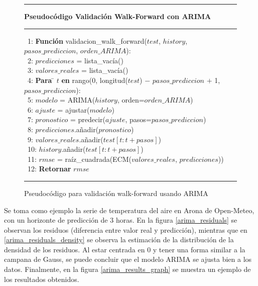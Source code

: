 \begin{figure}[H]
{\small
\hrule
{\bf\small Pseudocódigo Validación Walk-Forward con ARIMA}
\hrule
\begin{center}
\begin{tabbing}
\ 1: {\bf Fun}\={\bf ción} validacion\_walk\_forward($test$, $history$, $pasos\_prediccion$, $orden\_ARIMA$): \\
\ 2: \> $predicciones$ = lista\_vacía() \\
\ 3: \> $valores\_reales$ = lista\_vacía() \\
\ 4: \> {\bf Para} \= $t$ {\bf en} rango(0, longitud($test$) $-$ $pasos\_prediccion$ $+$ 1, $pasos\_prediccion$): \\
\ 5: \> \> $modelo$ = ARIMA($history$, orden=$orden\_ARIMA$) \\
\ 6: \> \> $ajuste$ = ajustar($modelo$) \\
\ 7: \> \> $pronostico$ = predecir($ajuste$, pasos=$pasos\_prediccion$) \\
\ 8: \> \> $predicciones$.añadir($pronostico$) \\
\ 9: \> \> $valores\_reales$.añadir($test[t : t+pasos]$) \\
\ 10: \> \> $history$.añadir($test[t : t+pasos]$) \\
\ 11: \> $rmse$ = raíz\_cuadrada(ECM($valores\_reales$, $predicciones$)) \\
\ 12: \> {\bf Retornar} $rmse$ \\
\end{tabbing}
\end{center}
}
\hrule
\caption{Pseudocódigo para validación walk-forward usando ARIMA}
\label{walk_forward_arima}
\end{figure}

Se toma como ejemplo la serie de temperatura del aire en Arona de Open-Meteo, con un horizonte de predicción de 3 horas. En la figura \ref{arima_residuals} se observan los residuos (diferencia entre valor real y predicción), mientras que en \ref{arima_residuals_density} se observa la estimación de la distribución de la densidad de los residuos.
Al estar centrada en 0 y tener una forma similar a la campana de Gauss, se puede concluir que el modelo ARIMA se ajusta bien a los datos. Finalmente, en la figura 
\ref{arima_results_graph} se muestra un ejemplo de los resultados obtenidos.

